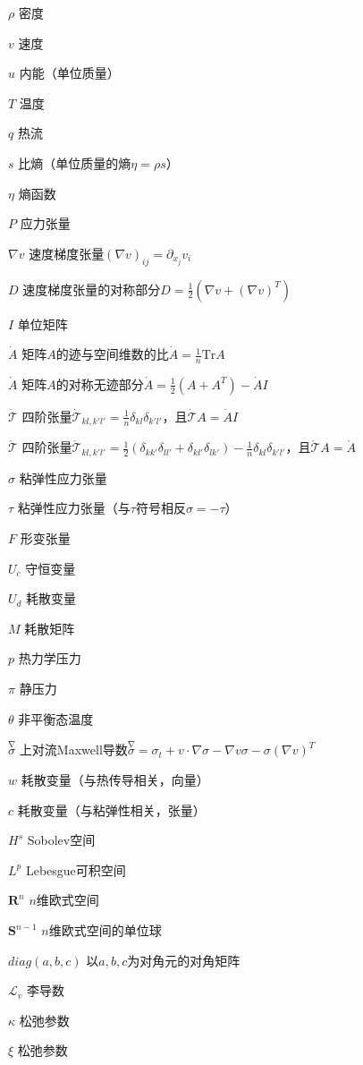 \begin{denotation}[3cm]

\item[$\rho$] 密度
\item[$v$] 速度
\item[$u$] 内能（单位质量）
\item[$T$] 温度
\item[$q$] 热流
\item[$s$] 比熵（单位质量的熵$\eta = \rho s$）
\item[$\eta$] 熵函数
\item[$P$] 应力张量
\item[$\nabla v$] 速度梯度张量$(\nabla v)_{ij} = \partial_{x_j} v_i$
\item[$D$] 速度梯度张量的对称部分$D = \frac{1}{2}(\nabla v + (\nabla v)^T)$
\item[$I$] 单位矩阵
\item[$\dot{A}$] 矩阵$A$的迹与空间维数的比$\dot{A} = \frac{1}{n} \mbox{Tr} A$
\item[$\mathring{A}$] 矩阵$A$的对称无迹部分$\mathring{A} = \frac{1}{2}(A+A^T) - \dot{A}I$
\item[$\dot{\mathcal{T}}$] 四阶张量$\dot{\mathcal{T}}_{kl,k'l'} = \frac{1}{n}\delta_{kl} \delta_{k'l'}$，且$\dot{\mathcal{T}} A = \dot{A} I$
\item[$\mathring{\mathcal{T}}$] 四阶张量$\mathring{\mathcal{T}}_{kl,k'l'} =\frac{1}{2}(\delta_{kk'}\delta_{ll'} + \delta_{kl'} \delta_{lk'} ) -\frac{1}{n}\delta_{kl} \delta_{k'l'} $，且$\mathring{\mathcal{T}} A = \mathring{A}$
\item[$\sigma$] 粘弹性应力张量
\item[$\tau$] 粘弹性应力张量（与$\tau$符号相反$\sigma=-\tau$）
\item[$F$] 形变张量
\item[$U_c$] 守恒变量
\item[$U_d$] 耗散变量
\item[$M$] 耗散矩阵
\item[$p$] 热力学压力
\item[$\pi$] 静压力
\item[$\theta$] 非平衡态温度
\item[$\stackrel{\nabla} \sigma$] 上对流Maxwell导数$\stackrel{\nabla} \sigma = \sigma_t + v \cdot \nabla \sigma - \nabla v \sigma - \sigma (\nabla v)^T$
\item[$w$] 耗散变量（与热传导相关，向量）
\item[$c$] 耗散变量（与粘弹性相关，张量）
\item[$H^s$] Sobolev空间
\item[$L^p$] Lebesgue可积空间
\item[$\mathbf{R}^n$] $n$维欧式空间
\item[$\mathbf{S}^{n-1}$] $n$维欧式空间的单位球
\item[$diag(a,b,c)$] 以$a,b,c$为对角元的对角矩阵
\item[$\mathcal{L}_v$] 李导数 
\item[$\kappa$] 松弛参数
\item[$\xi$] 松弛参数

\end{denotation}
